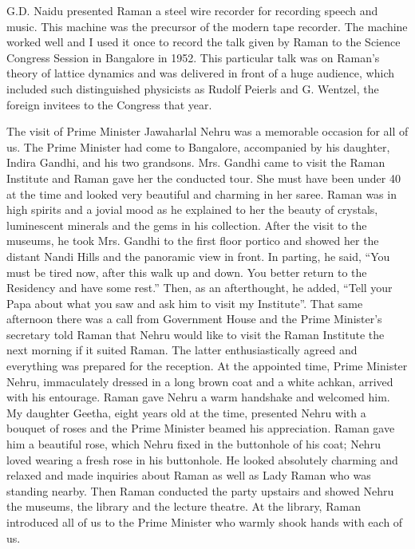 G.D. Naidu presented Raman a steel wire recorder for recording speech and music. This machine was the precursor of the modern tape recorder. The machine worked well and I used it once to record the talk given by Raman to the Science Congress Session in Bangalore in 1952. This particular talk was on Raman's theory of lattice dynamics and was delivered in front of a huge audience, which included such distinguished physicists as Rudolf Peierls and G. Wentzel, the foreign invitees to the Congress that year.

\medskip
{}
\smallskip


\noindent
The visit of Prime Minister Jawaharlal Nehru was a memorable occasion for all of us. The Prime Minister had come to Bangalore, accompanied by his daughter, Indira Gandhi, and his two grandsons. Mrs. Gandhi came to visit the Raman Institute and Raman gave her the conducted tour. She must have been under 40 at the time and looked very beautiful and charming in her saree. Raman was in high spirits and a jovial mood as he explained to her the beauty of crystals, luminescent minerals and the gems in his collection. After the visit to the museums, he took Mrs. Gandhi to the first floor portico and showed her the distant Nandi Hills and the panoramic view in front. In parting, he said, ``You must be tired now, after this walk up and down. You better return to the Residency and have some rest.'' Then, as an afterthought, he added, ``Tell your Papa about what you saw and ask him to visit my Institute''. That same afternoon there was a call from Government House and the Prime Minister's secretary told Raman that Nehru would like to visit the Raman Institute the next morning if it suited Raman. The latter enthusiastically agreed and everything was prepared for the reception. At the appointed time, Prime Minister Nehru, immaculately dressed in a long brown coat and a white achkan, arrived with his entourage. Raman gave Nehru a warm handshake and welcomed him. My daughter Geetha, eight years old at the time, presented Nehru with a bouquet of roses and the Prime Minister beamed his appreciation. Raman gave him a beautiful rose, which Nehru fixed in the buttonhole of his coat; Nehru loved wearing a fresh rose in his buttonhole. He looked absolutely charming and relaxed and made inquiries about Raman as well as Lady Raman who was standing nearby. Then Raman conducted the party upstairs and showed Nehru the museums, the library and the lecture theatre. At the library, Raman introduced all of us to the Prime Minister who warmly shook hands with each of us.

